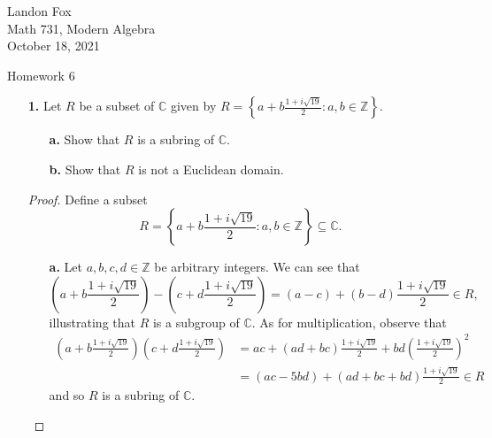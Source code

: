 \documentclass[ 12pt ]{article}
\begin{document}
\noindent Landon Fox \\
\noindent Math 731, Modern Algebra \\
\noindent October 18, 2021

\begin{center}
\Large Homework 6
\end{center}

\begin{enumerate}
	\item[\textbf{1.}] Let $R$ be a subset of $\mathbb{C}$ given by $R = \left\{ a + b \frac{1 + i\sqrt{19}}{2} : a, b \in \mathbb{Z} \right\}$.
	\begin{enumerate}
		\item[\textbf{a.}] Show that $R$ is a subring of $\mathbb{C}$.
		\item[\textbf{b.}] Show that $R$ is not a Euclidean domain.
	\end{enumerate}

		\begin{proof}
			Define a subset $$R = \left \{ a + b \frac{1 + i\sqrt{19}}{2} : a, b \in \mathbb{Z} \right \} \subseteq \mathbb{C}.$$
			\begin{enumerate}
				\item[\textbf{a.}] Let $a, b, c, d \in \mathbb{Z}$ be arbitrary integers. We can see that $$\left(a + b \frac{1 + i\sqrt{19}}{2}\right) - \left(c + d \frac{1 + i\sqrt{19}}{2}\right) = (a - c) + (b - d) \frac{1 + i\sqrt{19}}{2} \in R,$$ illustrating that $R$ is a subgroup of $\mathbb{C}$. As for multiplication, observe that
				\begin{align*}
					\left (a + b \frac{1 + i\sqrt{19}}{2} \right ) \left (c + d \frac{1 + i\sqrt{19}}{2} \right ) &= ac + (ad + bc) \frac{1 + i\sqrt{19}}{2} + bd \left ( \frac{1 + i\sqrt{19}}{2} \right )^2 \\
					&= (ac - 5bd) + (ad + bc + bd) \frac{1 + i\sqrt{19}}{2} \in R
				\end{align*}
				and so $R$ is a subring of $\mathbb{C}$.


\end{enumerate}
\end{proof}
\end{enumerate}
\end{document}
